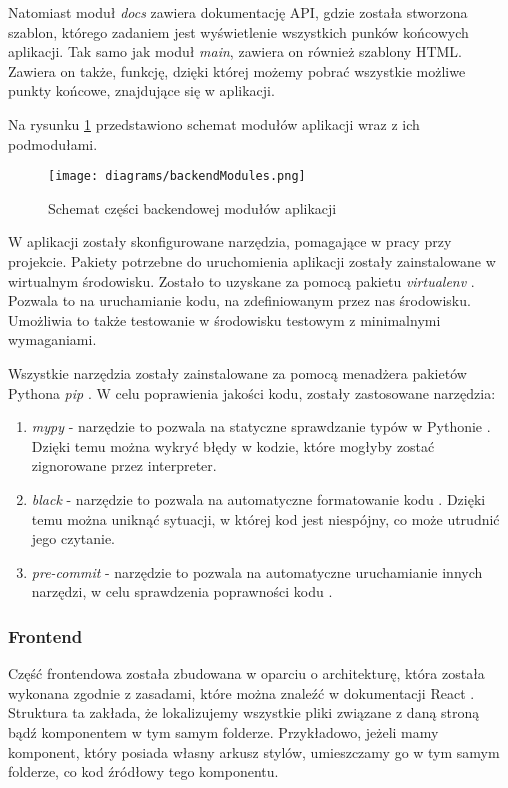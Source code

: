 Natomiast moduł \textit{docs} zawiera dokumentację API, gdzie została stworzona szablon, którego zadaniem jest wyświetlenie wszystkich punków końcowych aplikacji. Tak samo jak moduł \textit{main}, zawiera on również szablony HTML. Zawiera on także, funkcję, dzięki której możemy pobrać wszystkie możliwe punkty końcowe, znajdujące się w aplikacji.

Na rysunku \ref*{backend} przedstawiono schemat modułów aplikacji wraz z ich podmodułami.

\begin{figure}[H]
    \centering
    \texttt{[image: diagrams/backendModules.png]}
    \caption{Schemat części backendowej modułów aplikacji}
    \label{backend}
\end{figure}

W aplikacji zostały skonfigurowane narzędzia, pomagające w pracy przy projekcie. Pakiety potrzebne do uruchomienia aplikacji zostały zainstalowane w wirtualnym środowisku. Zostało to uzyskane za pomocą pakietu \textit{virtualenv} \cite{virtualenv}. Pozwala to na uruchamianie kodu, na zdefiniowanym przez nas środowisku. Umożliwia to także testowanie w środowisku testowym z minimalnymi wymaganiami. 

Wszystkie narzędzia zostały zainstalowane za pomocą menadżera pakietów Pythona \textit{pip} \cite{pip}. W celu poprawienia jakości kodu, zostały zastosowane narzędzia:
\begin{enumerate}
    \item \textit{mypy} - narzędzie to pozwala na statyczne sprawdzanie typów w Pythonie \cite{mypy}. Dzięki temu można wykryć błędy w kodzie, które mogłyby zostać zignorowane przez interpreter. 
    \item \textit{black} - narzędzie to pozwala na automatyczne formatowanie kodu \cite{black}. Dzięki temu można uniknąć sytuacji, w której kod jest niespójny, co może utrudnić jego czytanie.
    \item \textit{pre-commit} - narzędzie to pozwala na automatyczne uruchamianie innych narzędzi, w celu sprawdzenia poprawności kodu \cite{pre_commit}.
\end{enumerate}

\subsubsection{Frontend}
Część frontendowa została zbudowana w oparciu o architekturę, która została wykonana zgodnie z zasadami, które można znaleźć w dokumentacji \cite{React_file_structure} React \cite{React}. Struktura ta zakłada, że lokalizujemy wszystkie pliki związane z daną stroną bądź komponentem w tym samym folderze. Przykładowo, jeżeli mamy komponent, który posiada własny arkusz stylów, umieszczamy go w tym samym folderze, co kod źródłowy tego komponentu.


